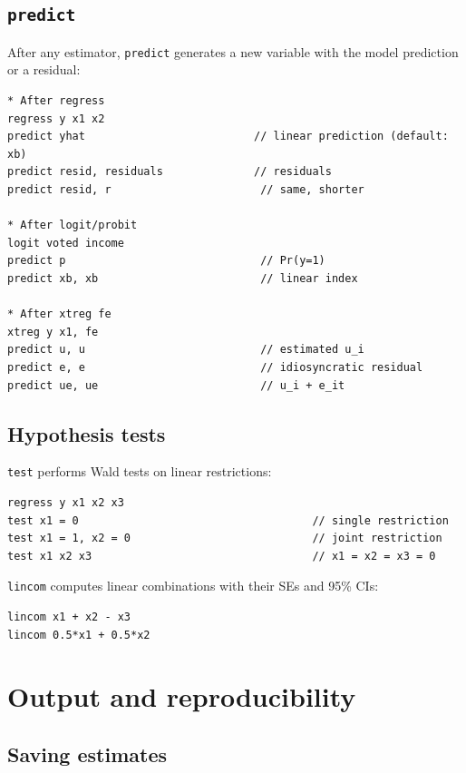 \documentclass[11pt,letterpaper]{article}
\begin{document}
\subsection{\texttt{predict}}

After any estimator, \texttt{predict} generates a new variable with
the model prediction or a residual:

\begin{lstlisting}
* After regress
regress y x1 x2
predict yhat                          // linear prediction (default: xb)
predict resid, residuals              // residuals
predict resid, r                       // same, shorter

* After logit/probit
logit voted income
predict p                              // Pr(y=1)
predict xb, xb                         // linear index

* After xtreg fe
xtreg y x1, fe
predict u, u                           // estimated u_i
predict e, e                           // idiosyncratic residual
predict ue, ue                         // u_i + e_it
\end{lstlisting}

\subsection{Hypothesis tests}

\texttt{test} performs Wald tests on linear restrictions:

\begin{lstlisting}
regress y x1 x2 x3
test x1 = 0                                    // single restriction
test x1 = 1, x2 = 0                            // joint restriction
test x1 x2 x3                                  // x1 = x2 = x3 = 0
\end{lstlisting}

\texttt{lincom} computes linear combinations with their SEs and 95\% CIs:

\begin{lstlisting}
lincom x1 + x2 - x3
lincom 0.5*x1 + 0.5*x2
\end{lstlisting}

\section{Output and reproducibility}

\subsection{Saving estimates}
\end{document}
